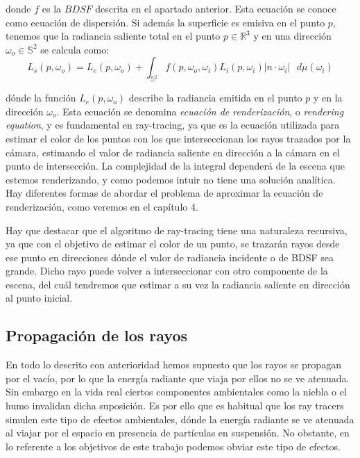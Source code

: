 donde $f$ es la $BDSF$ descrita en el apartado anterior. Esta ecuación se conoce como ecuación de dispersión. Si además la superficie es emisiva en el punto $p$, tenemos que la radiancia saliente total en el punto $p \in \mathds{R}^3$ y en una dirección $\omega _o \in \mathds{S}^2$ se calcula como:
\begin{equation}\label{renderingEquation}
L_s(p,\omega _o) = L_e(p,\omega_o) + \int _{\mathds{S}^2}f(p,\omega _o, \omega _i) L_i(p, \omega _i) |n\cdot \omega _i|\text{ }d\mu (\omega _i)
\end{equation}

dónde la función $L_e(p, \omega_o)$ describe la radiancia emitida en el punto $p$ y en la dirección $\omega_o$. Esta ecuación se denomina \emph{ecuación de renderización}, o \emph{rendering equation}, y es fundamental en ray-tracing, ya que es la ecuación utilizada para estimar el color de los puntos con los que interseccionan los rayos trazados por la cámara, estimando el valor de radiancia saliente en dirección a la cámara en el punto de intersección. La complejidad de la integral dependerá de la escena que estemos renderizando, y como podemos intuir no tiene una solución analítica. Hay diferentes formas de abordar el problema de aproximar la ecuación de renderización, como veremos en el capítulo 4.

Hay que destacar que el algoritmo de ray-tracing tiene una naturaleza recursiva, ya que con el objetivo de estimar el color de un punto, se trazarán rayos desde ese punto en direcciones dónde el valor de radiancia incidente o de BDSF sea grande. Dicho rayo puede volver a interseccionar con otro componente de la escena, del cuál tendremos que estimar a su vez la radiancia saliente en dirección al punto inicial.

\subsection{Propagación de los rayos}

En todo lo descrito con anterioridad hemos supuesto que los rayos se propagan por el vacío, por lo que la energía radiante que viaja por ellos no se ve atenuada. Sin embargo en la vida real ciertos componentes ambientales como la niebla o el humo invalidan dicha suposición. Es por ello que es habitual que los ray tracers simulen este tipo de efectos ambientales, dónde la energía radiante se ve atenuada al viajar por el espacio en presencia de partículas en suspensión. No obstante, en lo referente a los objetivos de este trabajo podemos obviar este tipo de efectos.

